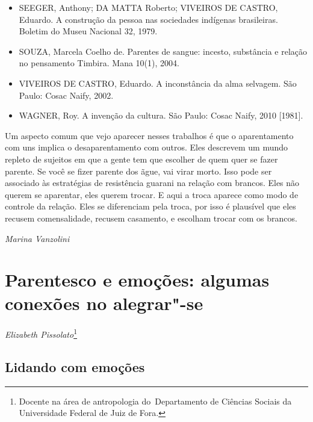 \begin{itemize}
\item SEEGER, Anthony; DA MATTA Roberto; VIVEIROS DE CASTRO, Eduardo. A
construção da pessoa nas sociedades indígenas brasileiras. Boletim do
Museu Nacional 32, 1979. 

\item SOUZA, Marcela Coelho de. Parentes de sangue: incesto, substância
e relação no pensamento Timbira. Mana 10(1), 2004.

\item VIVEIROS DE CASTRO, Eduardo. A inconstância da alma selvagem. São
Paulo: Cosac Naify, 2002.

\item WAGNER, Roy. A invenção da cultura. São Paulo: Cosac Naify, 2010
[1981].
\end{itemize}


Um aspecto comum que vejo aparecer nesses trabalhos é que o
aparentamento com uns implica o desaparentamento com outros. Eles
descrevem um mundo repleto de sujeitos em que a gente tem que escolher
de quem quer se fazer parente. Se você se fizer parente dos ãgue, vai
virar morto. Isso pode ser associado às estratégias de resistência
guarani na relação com brancos. Eles não querem se aparentar, eles
querem trocar. E aqui a troca aparece como modo de controle da relação.
Eles se diferenciam pela troca, por isso é plausível que eles recusem
comensalidade, recusem casamento, e escolham trocar com os brancos.
\medskip
\begin{flushright}
\emph{Marina Vanzolini}
\end{flushright}

\chapter{Parentesco e emoções: algumas conexões no
alegrar"-se}
\begin{flushright}
\emph{Elizabeth Pissolato}\footnote{Docente na área de antropologia
do~Departamento de Ciências Sociais da Universidade Federal de Juiz de
Fora.}
\end{flushright}

\section{Lidando com emoções}

